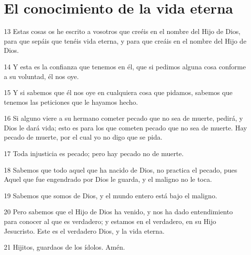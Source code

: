\section*{El conocimiento de la vida eterna}

\par 13 Estas cosas os he escrito a vosotros que creéis en el nombre del Hijo de Dios, para que sepáis que tenéis vida eterna, y para que creáis en el nombre del Hijo de Dios.
\par 14 Y esta es la confianza que tenemos en él, que si pedimos alguna cosa conforme a su voluntad, él nos oye.
\par 15 Y si sabemos que él nos oye en cualquiera cosa que pidamos, sabemos que tenemos las peticiones que le hayamos hecho.
\par 16 Si alguno viere a su hermano cometer pecado que no sea de muerte, pedirá, y Dios le dará vida; esto es para los que cometen pecado que no sea de muerte. Hay pecado de muerte, por el cual yo no digo que se pida.
\par 17 Toda injusticia es pecado; pero hay pecado no de muerte.
\par 18 Sabemos que todo aquel que ha nacido de Dios, no practica el pecado, pues Aquel que fue engendrado por Dios le guarda, y el maligno no le toca.
\par 19 Sabemos que somos de Dios, y el mundo entero está bajo el maligno.
\par 20 Pero sabemos que el Hijo de Dios ha venido, y nos ha dado entendimiento para conocer al que es verdadero; y estamos en el verdadero, en su Hijo Jesucristo. Este es el verdadero Dios, y la vida eterna.
\par 21 Hijitos, guardaos de los ídolos. Amén.

